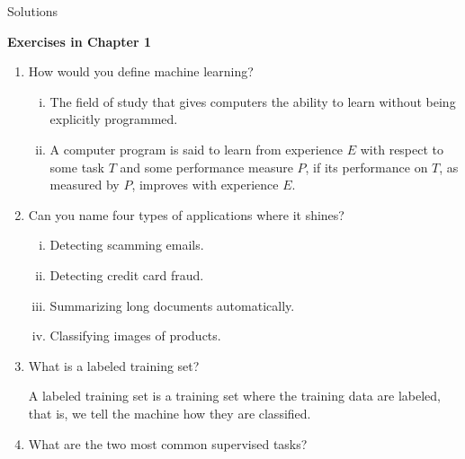 \documentclass[12pt,reqno]{amsart}
\newif\ifanswer
\begin{document}
\hspace{10.5cm} {\footnotesize Solutions}

\vspace{0.5cm}
\hspace{5.5cm}\textbf{\large Exercises in Chapter 1}
\vspace{0.5cm}

\begin{enumerate}[1.]

\item How would you define machine learning?

\ifanswer
{}
\begin{enumerate}[(i)]
\item The field of study that gives computers the ability to learn without being explicitly programmed.
\item A computer program is said to learn from experience $E$ with respect to some task $T$ and some performance measure $P$,
if its performance on $T$, as measured by $P$, improves with experience $E$.
\end{enumerate}
\vspace{1cm}



\item Can you name four types of applications where it shines?

\ifanswer
{}
\begin{enumerate}[(i)]
\item Detecting scamming emails.
\item Detecting credit card fraud.
\item Summarizing long documents automatically.
\item Classifying images of products.
\end{enumerate}
\vspace{1cm}



\item What is a labeled training set?

\ifanswer
{}
A labeled training set is a training set where the training data are labeled, that is,
we tell the machine how they are classified.
\vspace{1cm}



\item What are the two most common supervised tasks?


\end{enumerate}
\end{document}
